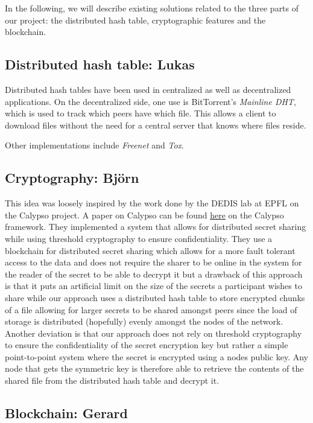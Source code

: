 \documentclass[12pt,a4paper,draft]{article}
\begin{document}
In the following, we will describe existing solutions related to the three parts of our project: the distributed hash table, cryptographic features and the blockchain.

\subsection{Distributed hash table: Lukas}

Distributed hash tables have been used in centralized as well as decentralized applications.
On the decentralized side, one use is BitTorrent's \emph{Mainline DHT}, which is used to track which peers have which file.
This allows a client to download files without the need for a central server that knows where files reside.

Other implementations include \emph{Freenet} and \emph{Tox}.

\subsection{Cryptography: Björn}

This idea was loosely inspired by the work done by the DEDIS lab at EPFL on the Calypso project. A paper on Calypso can be found \href{https://eprint.iacr.org/2018/209.pdf}{here} on the Calypso framework. They implemented a system that allows for distributed secret sharing while using threshold cryptography to ensure confidentiality. They use a blockchain for distributed secret sharing which allows for a more fault tolerant access to the data and does not require the sharer to be online in the system for the reader of the secret to be able to decrypt it but a drawback of this approach is that it puts an artificial limit on the size of the secrets a participant wishes to share while our approach uses a distributed hash table to store encrypted chunks of a file allowing for larger secrets to be shared amongst peers since the load of storage is distributed (hopefully) evenly amongst the nodes of the network. Another deviation is that our approach does not rely on threshold cryptography to ensure the confidentiality of the secret encryption key but rather a simple point-to-point system where the secret is encrypted using a nodes public key. Any node that gets the symmetric key is therefore able to retrieve the contents of the shared file from the distributed hash table and decrypt it.

\subsection{Blockchain: Gerard}
\end{document}
